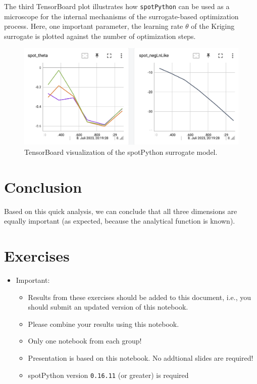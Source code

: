 \documentclass[
  letterpaper,
  DIV=11,
  numbers=noendperiod]{scrreprt}
\providecommand{\tightlist}{%
  \setlength{\itemsep}{0pt}\setlength{\parskip}{0pt}}\usepackage{longtable,booktabs,array}
\begin{document}
The third TensorBoard plot illustrates how \texttt{spotPython} can be
used as a microscope for the internal mechanisms of the surrogate-based
optimization process. Here, one important parameter, the learning rate
\(\theta\) of the Kriging surrogate is plotted against the number of
optimization steps.

\begin{figure}[H]

{\centering \includegraphics[width=1\textwidth,height=\textheight]{figures_static/02_tensorboard_03.png}

}

\caption{TensorBoard visualization of the spotPython surrogate model.}

\end{figure}%

\section{Conclusion}\label{conclusion}

Based on this quick analysis, we can conclude that all three dimensions
are equally important (as expected, because the analytical function is
known).

\section{Exercises}\label{exercises-2}

\begin{itemize}
\tightlist
\item
  Important:

  \begin{itemize}
  \tightlist
  \item
    Results from these exercises should be added to this document, i.e.,
    you should submit an updated version of this notebook.
  \item
    Please combine your results using this notebook.
  \item
    Only one notebook from each group!
  \item
    Presentation is based on this notebook. No addtional slides are
    required!
  \item
    spotPython version \texttt{0.16.11} (or greater) is required
  \end{itemize}
\end{itemize}
\end{document}
